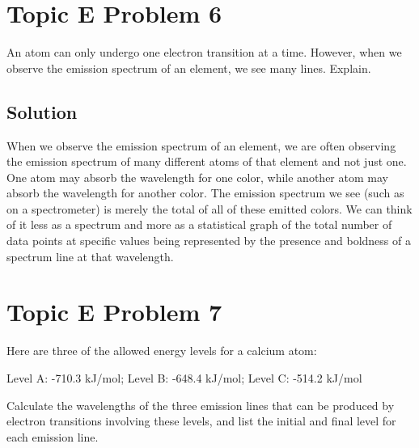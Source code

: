 \documentclass[10pt]{article}
\begin{document}
    \section{Topic E Problem 6}
        An atom can only undergo one electron transition at a time. 
        However, when we observe the emission spectrum of an element, we see many lines. 
        Explain.

        \subsection{Solution}
            When we observe the emission spectrum of an element, we are often observing the emission spectrum of many different atoms of that element and not just one.
            One atom may absorb the wavelength for one color, while another atom may absorb the wavelength for another color.
            The emission spectrum we see (such as on a spectrometer) is merely the total of all of these emitted colors.
            We can think of it less as a spectrum and more as a statistical graph of the total number of data points at specific values being represented by the presence and boldness of a spectrum line at that wavelength.

    \pagebreak
    \section{Topic E Problem 7}
        Here are three of the allowed energy levels for a calcium atom:
        \begin{center}
            Level A: -710.3 kJ/mol; Level B: -648.4 kJ/mol; Level C: -514.2 kJ/mol
        \end{center}
        Calculate the wavelengths of the three emission lines that can be produced by electron transitions involving these levels, and list the initial and final level for each emission line.
\end{document}
